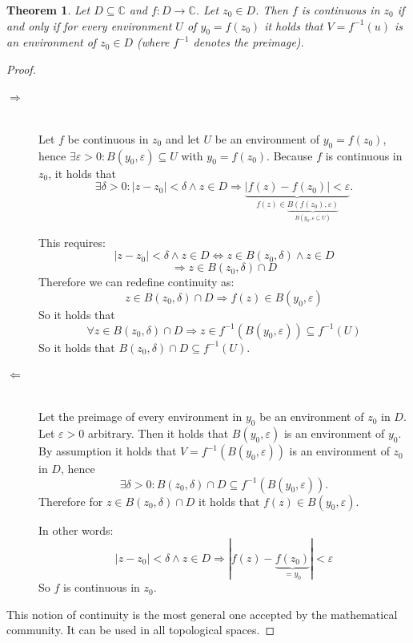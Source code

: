 \documentclass[a4paper,landscape,twocolumn]{article}
\newtheorem{theorem}{Theorem}
\newcommand\abs[1]{\left|#1\right|}
\begin{document}
\begin{theorem}
  Let $D \subseteq \mathbb C$ and $f: D \rightarrow \mathbb C$.
  Let $z_0 \in D$. Then $f$ is continuous in $z_0$
  if and only if for every environment $U$ of $y_0 = f(z_0)$
  it holds that $V = f^{-1}(u)$ is an environment of $z_0 \in D$
  (where $f^{-1}$ denotes the preimage).
\end{theorem}

\begin{proof}
  \begin{description}
    \item[$\Rightarrow$] \hfill{} \\
      Let $f$ be continuous in $z_0$ and let $U$ be an environment
      of $y_0 = f(z_0)$, hence $\exists \varepsilon > 0: B(y_0, \varepsilon)
      \subseteq U$ with $y_0 = f(z_0)$. Because $f$ is continuous in $z_0$,
      it holds that
      \[
        \exists \delta > 0:
        \abs{z - z_0} < \delta \land z \in D \Rightarrow
        \underbrace{\abs{f(z) - f(z_0)} < \varepsilon}_{f(z) \in \underbrace{B(f(z_0), \varepsilon)}_{B(y_0, \varepsilon \subseteq U)}}.
      \]

      This requires:
      \[
        \abs{z - z_0} < \delta \land z \in D \Leftrightarrow z \in B(z_0, \delta) \land z \in D
      \]
      \[ \Rightarrow z \in B(z_0, \delta) \cap D \]
      Therefore we can redefine continuity as:
      \[ z \in B(z_0, \delta) \cap D \Rightarrow f(z) \in B(y_0, \varepsilon) \]
      So it holds that
      \[ \forall z \in B(z_0, \delta) \cap D \Rightarrow z \in f^{-1}(B(y_0, \varepsilon)) \subseteq f^{-1}(U) \]
      So it holds that $B(z_0, \delta) \cap D \subseteq f^{-1}(U)$.

    \item[$\Leftarrow$] \hfill{} \\
      Let the preimage of every environment in $y_0$ be an environment of $z_0$ in $D$.
      Let $\varepsilon > 0$ arbitrary. Then it holds that $B(y_0, \varepsilon)$ is an environment of $y_0$.
      By assumption it holds that $V = f^{-1}(B(y_0, \varepsilon))$ is an environment of $z_0$ in $D$,
      hence
      \[ \exists \delta > 0: B(z_0, \delta) \cap D \subseteq f^{-1}(B(y_0, \varepsilon)). \]
      Therefore for $z \in B(z_0, \delta) \cap D$ it holds that $f(z) \in B(y_0, \varepsilon)$.

      In other words:
      \[ \abs{z - z_0} < \delta \land z \in D \Rightarrow |f(z) - \underbrace{f(z_0)}_{= y_0}| < \varepsilon \]
      So $f$ is continuous in $z_0$.
  \end{description}
  This notion of continuity is the most general one accepted by the mathematical community.
  It can be used in all topological spaces.
\end{proof}
\end{document}
